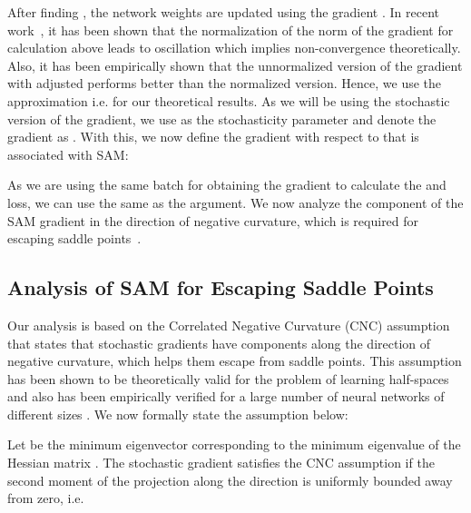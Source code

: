 \documentclass{article}
\begin{document}
After finding , the network weights are updated using the gradient . In recent work~\cite{andriushchenko2022understanding}, it has been shown that the normalization of the norm of the gradient for  calculation above leads to oscillation which implies non-convergence theoretically. Also, it has been empirically shown that the unnormalized version of the gradient with adjusted  performs better than the normalized version. Hence, we use the approximation i.e.  for our theoretical results. As we will be using the stochastic version of the gradient, we use  as the stochasticity parameter and denote the gradient as . With this, we now define the gradient with respect to  that is associated with SAM:

As we are using the same batch for obtaining the gradient to calculate the  and loss, we can use the same  as the argument. We now analyze the component of the SAM gradient in the direction of negative curvature, which is required for escaping saddle points~\cite{daneshmand2018escaping}. 

\subsection{Analysis of SAM for Escaping Saddle Points}
\label{sam_saddle}

Our analysis is based on the Correlated Negative Curvature (CNC) assumption \citep{daneshmand2018escaping} that states that stochastic gradients have components along the direction of negative curvature, which helps them escape from saddle points. This assumption has been shown to be theoretically valid for the problem of learning half-spaces and also has been empirically verified for a large number of neural networks of different sizes \cite{daneshmand2018escaping}. We now formally state the assumption below:
\begin{assumption}
\label{ass:cnc}
Let  be the minimum eigenvector corresponding to the minimum eigenvalue of the Hessian matrix . The stochastic gradient  satisfies the CNC assumption if the second moment of the projection along the direction  is uniformly bounded away from zero, i.e.


\end{assumption}
\end{document}
